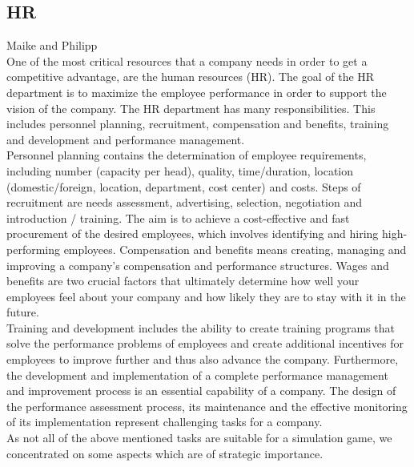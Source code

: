 \subsection{HR} \label{HR_manual}
Maike and Philipp \\
One of the most critical resources that a company needs in order to get a competitive advantage, are the human resources (HR). 
The goal of the HR department is to maximize the employee performance in order to support the vision of the company. The HR department has many responsibilities. This includes personnel planning, recruitment, compensation and benefits, training and development and performance management.\\
Personnel planning contains the determination of employee requirements, including number (capacity per head), quality, time/duration, location (domestic/foreign, location, department, cost center) and costs. Steps of recruitment are needs assessment, advertising, selection, negotiation and introduction / training. The aim is to achieve a cost-effective and fast procurement of the desired employees, which involves identifying and hiring high-performing employees. 
Compensation and benefits means creating, managing and improving a company's compensation and performance structures. Wages and benefits are two crucial factors that ultimately determine how well your employees feel about your company and how likely they are to stay with it in the future.\\ 
Training and development includes the ability to create training programs that solve the performance problems of employees and create additional incentives for employees to improve further and thus also advance the company. 
Furthermore, the development and implementation of a complete performance management and improvement process is an essential capability of a company. The design of the performance assessment process, its maintenance and the effective monitoring of its implementation represent challenging tasks for a company. \\
As not all of the above mentioned tasks are suitable for a simulation game, we concentrated on some aspects which are of strategic importance.
